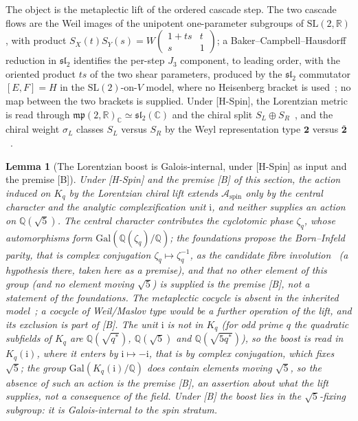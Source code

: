 \documentclass[11pt]{article}
\newtheorem{lemma}{Lemma}
\theoremstyle{definition}
\theoremstyle{remark}
\newcommand{\Gal}{\mathrm{Gal}}
\begin{document}
    The object is the metaplectic lift of the ordered cascade step.
    The two cascade flows are the Weil images of the unipotent one-parameter subgroups of $\mathrm{SL}(2,\mathbb{R})$,
    with product $S_X(t)S_Y(s)=W\!\left(\begin{smallmatrix}1+ts&t\\s&1\end{smallmatrix}\right)$; a
    Baker--Campbell--Hausdorff reduction in $\mathfrak{sl}_2$ identifies the per-step $J_3$ component, to leading order, with the
    oriented product $ts$ of the two shear parameters, produced by the $\mathfrak{sl}_2$ commutator $[E,F]=H$ in the
    $\mathrm{SL}(2)$-on-$V$ model, where no Heisenberg bracket is used~\cite{Beau2026prs,Beau2026aar}; no map between the two
    brackets is supplied.
    Under [H-Spin], the Lorentzian metric is read through $\mathfrak{mp}(2,\mathbb{R})_{\mathbb{C}}\simeq\mathfrak{sl}_2(\mathbb{C})$ and the
    chiral split $S_L\oplus S_R$~\cite{Beau2026q14}, and the chiral weight $\sigma_L$ classes $S_L$ versus $S_R$ by the Weyl
    representation type $\mathbf{2}$ versus $\bar{\mathbf{2}}$~\cite{Beau2026cho}.

    \begin{lemma}[The Lorentzian boost is Galois-internal, under {[H-Spin]} as input and the premise {[B]}]
      \label{lem:boost}
      Under [H-Spin] and the premise [B] of this section, the action induced on $K_q$ by the Lorentzian chiral lift extends
$\mathcal{A}_{\mathrm{spin}}$ only by the central character and the analytic complexification unit $\mathrm{i}$, and
neither supplies an action on $\mathbb{Q}(\sqrt{5})$.
The central character contributes the cyclotomic phase $\zeta_q$, whose automorphisms form
$\Gal(\mathbb{Q}(\zeta_q)/\mathbb{Q})$; the foundations propose the Born--Infeld parity, that is complex conjugation
$\zeta_q\mapsto\zeta_q^{-1}$, as the candidate fibre involution~\cite{Beau2026m} (a hypothesis there, taken here as a premise), and that no other element of this group
(and no element moving $\sqrt{5}$) is supplied is the premise [B], not a statement of the foundations.
      The metaplectic cocycle is absent in the inherited model~\cite{Beau2026cho}; a cocycle of Weil/Maslov type would be
      a further operation of the lift, and its exclusion is part of [B].
      The unit $\mathrm{i}$ is not in $K_q$ (for odd prime $q$ the quadratic subfields of $K_q$ are
      $\mathbb{Q}(\sqrt{q^{*}})$, $\mathbb{Q}(\sqrt{5})$ and $\mathbb{Q}(\sqrt{5q^{*}})$), so the boost is read in $K_q(\mathrm{i})$,
      where it enters by $\mathrm{i}\mapsto-\mathrm{i}$, that is by complex conjugation, which fixes $\sqrt{5}$; the group
      $\Gal(K_q(\mathrm{i})/\mathbb{Q})$ does contain elements moving $\sqrt{5}$, so the absence of such an action is the
premise [B], an assertion about what the lift supplies, not a consequence of the field.
Under [B] the boost lies in the $\sqrt{5}$-fixing subgroup: it is Galois-internal to the spin stratum.
    \end{lemma}
\end{document}
